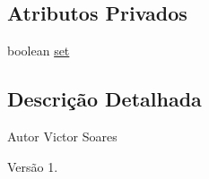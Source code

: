 \subsection*{Atributos Privados}
\begin{DoxyCompactItemize}
\item 
boolean \hyperlink{classic_1_1populacional_1_1seres_1_1binarios_1_1_caracteristica_binaria_a681ee9eb0af3a4e8dfc2f5534602f558}{set}
\end{DoxyCompactItemize}


\subsection{Descrição Detalhada}
\begin{DoxyAuthor}{Autor}
Victor Soares 
\end{DoxyAuthor}
\begin{DoxyVersion}{Versão}
1. 
\end{DoxyVersion}


